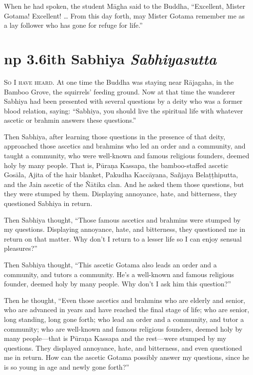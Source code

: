 \documentclass[12pt,openany]{book}%
\newcommand*{\suttatitleacronym}[1]{\smaller[2]{#1}\vspace*{.3em}}
\newcommand*{\suttatitletranslation}[1]{\linebreak{#1}}
\newcommand*{\suttatitleroot}[1]{\linebreak\smaller[2]\itshape{#1}}
\newcommand*{\tocacronym}[1]{\hspace*{-3.3em}{#1}\quad}
\newcommand*{\toctranslation}[1]{#1}
\newcommand*{\tocroot}[1]{(\textit{#1})}
\newcommand*{\scevam}[1]{\textsc{#1}}
\begin{document}
When he had spoken, the student \textsanskrit{Māgha} said to the Buddha, “Excellent, Mister Gotama! Excellent! … From this day forth, may Mister Gotama remember me as a lay follower who has gone for refuge for life.” 

%
\section*{{\suttatitleacronym Snp 3.6}{\suttatitletranslation With Sabhiya }{\suttatitleroot Sabhiyasutta}}
\addcontentsline{toc}{section}{\tocacronym{Snp 3.6} \toctranslation{With Sabhiya } \tocroot{Sabhiyasutta}}

\scevam{So I have heard. }At one time the Buddha was staying near \textsanskrit{Rājagaha}, in the Bamboo Grove, the squirrels’ feeding ground. Now at that time the wanderer Sabhiya had been presented with several questions by a deity who was a former blood relation, saying: “Sabhiya, you should live the spiritual life with whatever ascetic or brahmin answers these questions.” 

Then Sabhiya, after learning those questions in the presence of that deity, approached those ascetics and brahmins who led an order and a community, and taught a community, who were well-known and famous religious founders, deemed holy by many people. That is, \textsanskrit{Pūraṇa} Kassapa, the bamboo-staffed ascetic \textsanskrit{Gosāla}, Ajita of the hair blanket, Pakudha \textsanskrit{Kaccāyana}, \textsanskrit{Sañjaya} \textsanskrit{Belaṭṭhiputta}, and the Jain ascetic of the \textsanskrit{Ñātika} clan. And he asked them those questions, but they were stumped by them. Displaying annoyance, hate, and bitterness, they questioned Sabhiya in return. 

Then Sabhiya thought, “Those famous ascetics and brahmins were stumped by my questions. Displaying annoyance, hate, and bitterness, they questioned me in return on that matter. Why don’t I return to a lesser life so I can enjoy sensual pleasures?” 

Then Sabhiya thought, “This ascetic Gotama also leads an order and a community, and tutors a community. He’s a well-known and famous religious founder, deemed holy by many people. Why don’t I ask him this question?” 

Then he thought, “Even those ascetics and brahmins who are elderly and senior, who are advanced in years and have reached the final stage of life; who are senior, long standing, long gone forth; who lead an order and a community, and tutor a community; who are well-known and famous religious founders, deemed holy by many people—that is \textsanskrit{Pūraṇa} Kassapa and the rest—were stumped by my questions. They displayed annoyance, hate, and bitterness, and even questioned me in return. How can the ascetic Gotama possibly answer my questions, since he is so young in age and newly gone forth?” 
\end{document}
